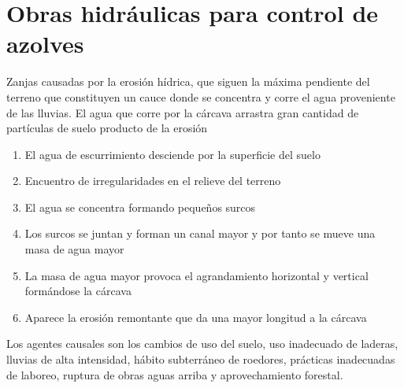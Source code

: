     \section{Obras hidráulicas para control de azolves}
    \begin{definition}[Carcavas]
        Zanjas causadas por la erosión hídrica, que siguen la máxima pendiente del terreno que constituyen un cauce donde se concentra y corre el agua proveniente de las lluvias. El agua que corre por la cárcava arrastra gran cantidad de partículas de suelo producto de la erosión
    \end{definition}
    \begin{enumerate}
        \item El agua de escurrimiento desciende por la superficie del suelo
        \item Encuentro de irregularidades en el relieve del terreno
        \item El agua se concentra formando pequeños surcos
        \item Los surcos se juntan y forman un canal mayor y por tanto se mueve una masa de agua mayor
        \item La masa de agua mayor provoca el agrandamiento horizontal y vertical formándose la cárcava
        \item Aparece la erosión remontante que da una mayor longitud a la cárcava
    \end{enumerate}
    Los agentes causales son los cambios de uso del suelo, uso inadecuado de laderas, lluvias de alta intensidad, hábito subterráneo de roedores, prácticas inadecuadas de laboreo, ruptura de obras aguas arriba y aprovechamiento forestal.
    
